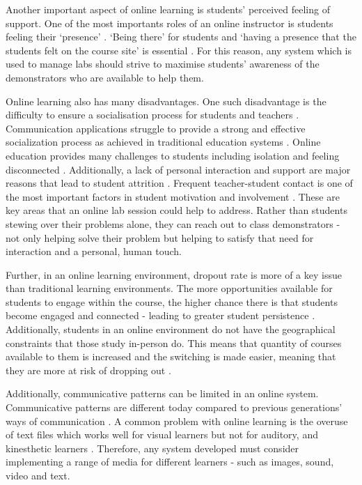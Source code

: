 Another important aspect of online learning is students' perceived feeling of support. One of the most importants roles of an online instructor is students feeling their `presence’ \cite{martinteams}. `Being there’ for students and `having a presence that the students felt on the course site’ is essential \cite{martin}. For this reason, any system which is used to manage labs should strive to maximise students' awareness of the demonstrators who are available to help them. 

Online learning also has many disadvantages. One such disadvantage is the difficulty to ensure a socialisation process for students and teachers \cite{kose}. Communication applications struggle to provide a strong and effective socialization process as achieved in traditional education systems \cite{kose}. Online education provides many challenges to students including isolation and feeling disconnected \cite{betts}. Additionally, a lack of personal interaction and support are major reasons that lead to student attrition \cite{betts}. Frequent teacher-student contact is one of the most important factors in student motivation and involvement \cite{chick}.  These are key areas that an online lab session could help to address. Rather than students stewing over their problems alone, they can reach out to class demonstrators - not only helping solve their problem but helping to satisfy that need for interaction and a personal, human touch.

Further, in an online learning environment, dropout rate is more of a key issue \cite{kose} than traditional learning environments. The more opportunities available for students to engage within the course, the higher chance there is that students become engaged and connected - leading to greater student persistence \cite{chick}\cite{betts}. Additionally, students in an online environment do not have the geographical constraints that those study in-person do. This means that quantity of courses available to them is increased and the switching is made easier, meaning that they are more at risk of dropping out \cite{betts}.

Additionally, communicative patterns can be limited in an online system. Communicative patterns are different today compared to previous generations’ ways of communication \cite{selander}. A common problem with online learning is the overuse of text files which works well for visual learners
but not for auditory, and kinesthetic learners \cite{peter}. Therefore, any system developed must consider implementing a range of media for different learners - such as images, sound, video and text.

